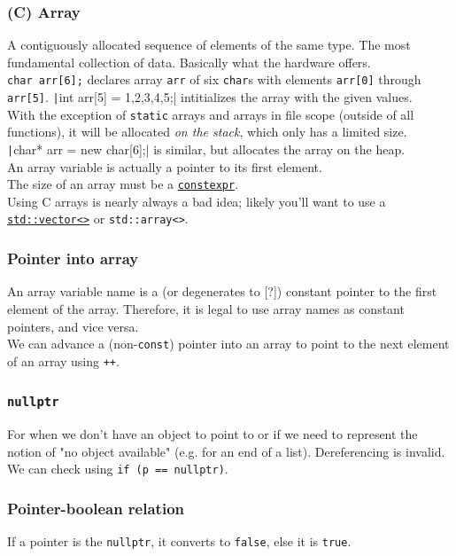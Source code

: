 \documentclass[table, xcdraw]{article}%
\begin{document}
\subsubsection{(C) Array} \label{array}
A contiguously allocated sequence of elements of the same type. The most fundamental collection of data. Basically what the hardware offers.\\
\texttt{char arr[6];} declares array \texttt{arr} of six \texttt{char}s with elements \texttt{arr[0]} through \texttt{arr[5]}. \texttt|int arr[5] = {1,2,3,4,5};| intitializes the array with the given values.\\
With the exception of \texttt{static} arrays and arrays in file scope (outside of all functions), it will be allocated \textit{on the stack}, which only has a limited size.\\
\texttt|char* arr = new char[6];| is similar, but allocates the array on the heap.\\
An array variable is actually a pointer to its first element.\\
The size of an array must be a \hyperref[constexpr]{\texttt{constexpr}}.\\
Using C arrays is nearly always a bad idea; likely you'll want to use a \hyperref[std_vector]{\texttt{std::vector<>}} or \texttt{std::array<>}.

\subsubsection{Pointer into array}
An array variable name is a (or degenerates to [?]) constant pointer to the first element of the array. Therefore, it is legal to use array names as constant pointers, and vice versa.\\
We can advance a (non-\texttt{const}) pointer into an array to point to the next element of an array using \texttt{++}.

\subsubsection{\texttt{nullptr}}
For when we don't have an object to point to or if we need to represent the notion of "no object available" (e.g. for an end of a list). Dereferencing is invalid. We can check using \texttt{if (p == nullptr)}.

\subsubsection{Pointer-boolean relation}
If a pointer is the \texttt{nullptr}, it converts to \texttt{false}, else it is \texttt{true}.
\end{document}

